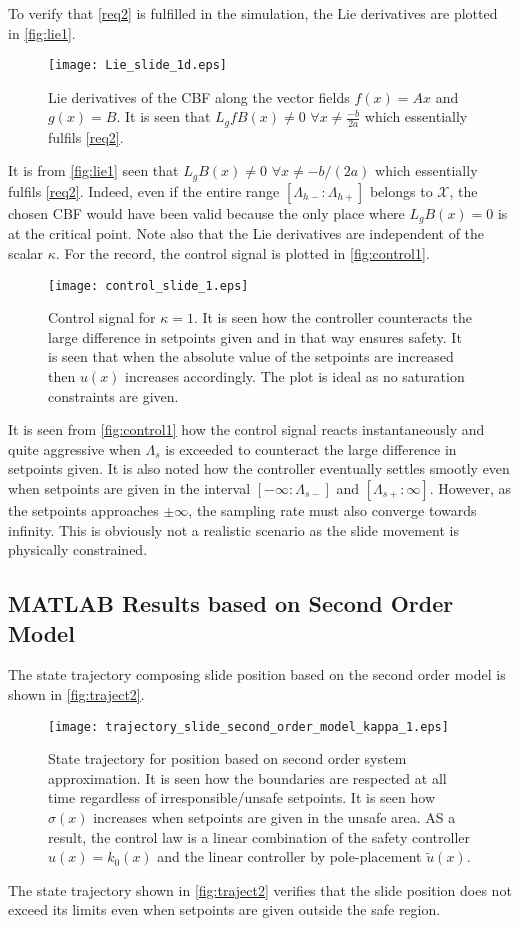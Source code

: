 To verify that \autoref{req2} is fulfilled in the simulation, the Lie derivatives are plotted in \autoref{fig:lie1}.
\begin{figure}[H]
	\center
		\texttt{[image: Lie\_slide\_1d.eps]}
	\caption{Lie derivatives of the CBF along the vector fields $f(x) = Ax$ and $g(x)=B$. It is seen that $L_gfB(x) \neq 0 \,\, \forall x \neq \frac{-b}{2a}$ which essentially fulfils \autoref{req2}.}
	\label{fig:lie1}
\end{figure}
It is from \autoref{fig:lie1} seen that $L_gB(x) \neq 0 \,\, \forall x \neq -b/(2a)$ which essentially fulfils \autoref{req2}. Indeed, even if the entire range $[\Lambda_{h-}:\Lambda_{h+}]$ belongs to $\mathcal{X}$, the chosen CBF would have been valid because the only place where $L_gB(x) = 0$ is at the critical point. Note also that the Lie derivatives are independent of the scalar $\kappa$.
For the record, the control signal is plotted in \autoref{fig:control1}.
\begin{figure}[H]
	\center
		\texttt{[image: control\_slide\_1.eps]}
	\caption{Control signal for $\kappa=1$. It is seen how the controller counteracts the large difference in setpoints given and in that way ensures safety. It is seen that when the absolute value of the setpoints are increased then $u(x)$ increases accordingly. The plot is ideal as no saturation constraints are given.}
	\label{fig:control1}
\end{figure}
It is seen from \autoref{fig:control1} how the control signal reacts instantaneously and quite aggressive when $\Lambda_s$ is exceeded to counteract the large difference in setpoints given. It is also noted how the controller eventually settles smootly even when setpoints are given in the interval $[-\infty:\Lambda_{s-}]$ and $[\Lambda_{s+}:\infty]$. However, as the setpoints approaches $\pm \infty$, the sampling rate must also converge towards infinity. This is obviously not a realistic scenario as the slide movement is physically constrained.
\vspace{-0.3cm}
\subsection{MATLAB Results based on Second Order Model}\label{subsec:matlab-resutls-2-order}
The state trajectory composing slide position based on the second order model is shown in \autoref{fig:traject2}.
\begin{figure}[H]
	\center
		\texttt{[image: trajectory\_slide\_second\_order\_model\_kappa\_1.eps]}
	\caption{State trajectory for position based on second order system approximation. It is seen how the boundaries are respected at all time regardless of irresponsible/unsafe setpoints. It is seen how $\sigma(x)$ 	increases when setpoints are given in the unsafe area. AS a result, the control law is a linear combination of the safety controller $u(x) = k_0(x)$ and the linear controller by pole-placement $\tilde{u}(x)$.}
	\label{fig:traject2}
\end{figure}
The state trajectory shown in \autoref{fig:traject2} verifies that the slide position does not exceed its limits even when setpoints are given outside the safe region.

